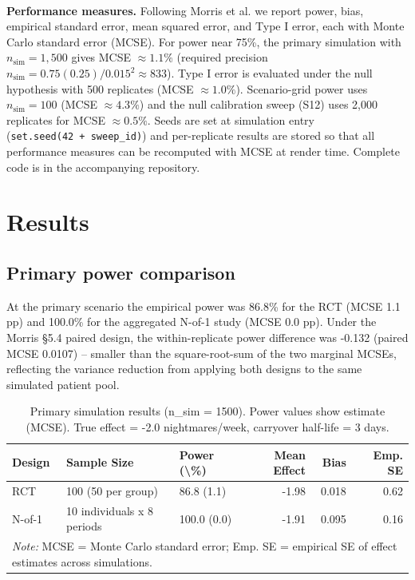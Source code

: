 \documentclass[
  11pt,
]{article}
\begin{document}
\textbf{Performance measures.} Following Morris et al.\textsuperscript{} we report power, bias, empirical standard
error, mean squared error, and Type I error, each with Monte
Carlo standard error (MCSE). For power near 75\%, the primary
simulation with \(n_{\text{sim}} = 1{,}500\) gives MCSE
\(\approx 1.1\%\) (required precision
\(n_{\text{sim}} = 0.75(0.25)/0.015^{2} \approx 833\)). Type I
error is evaluated under the null hypothesis with 500 replicates
(MCSE \(\approx 1.0\%\)). Scenario-grid power uses
\(n_{\text{sim}} = 100\) (MCSE \(\approx 4.3\%\)) and the null
calibration sweep (S12) uses 2,000 replicates for MCSE \(\approx
0.5\%\). Seeds are set at simulation entry
(\texttt{set.seed(42\ +\ sweep\_id)}) and per-replicate results are stored
so that all performance measures can be recomputed with MCSE at
render time. Complete code is in the accompanying repository.

\section{Results}\label{results}

\subsection{Primary power comparison}\label{primary-power-comparison}

At the primary scenario the empirical power was
86.8\% for the RCT
(MCSE 1.1 pp)
and 100.0\% for the
aggregated N-of-1 study (MCSE
0.0 pp).
Under the Morris §5.4 paired design, the within-replicate power
difference was -0.132 (paired
MCSE 0.0107) -- smaller
than the square-root-sum of the two marginal MCSEs, reflecting
the variance reduction from applying both designs to the same
simulated patient pool.

\begin{table}[!h]
\centering
\caption{\label{tab:primary-results-table}Primary simulation results (n\_sim = 1500). Power values show estimate (MCSE). True effect = -2.0 nightmares/week, carryover half-life = 3 days.}
\centering
\begin{tabular}[t]{lllrrr}
\toprule
Design & Sample Size & Power (\textbackslash{}\%) & Mean Effect & Bias & Emp. SE\\
\midrule
RCT & 100 (50 per group) & 86.8 (1.1) & -1.98 & 0.018 & 0.62\\
N-of-1 & 10 individuals x 8 periods & 100.0 (0.0) & -1.91 & 0.095 & 0.16\\
\bottomrule
\multicolumn{6}{l}{\rule{0pt}{1em}\textit{Note: } MCSE = Monte Carlo standard error; Emp. SE = empirical SE of effect estimates across simulations.}\\
\end{tabular}
\end{table}
\end{document}
